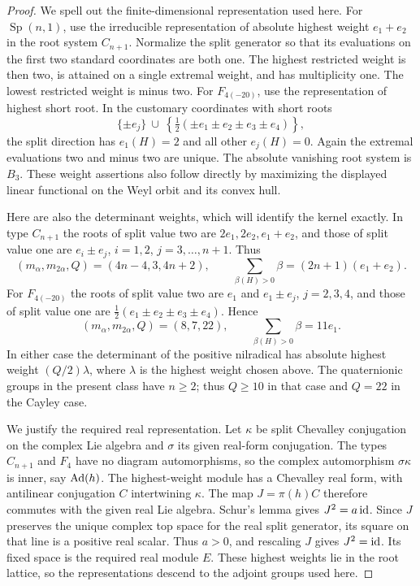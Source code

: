 \begin{proof}
We spell out the finite-dimensional representation used here.  For
$\operatorname{Sp}(n,1)$, use the irreducible representation of absolute highest
weight $e_1+e_2$ in the root system $C_{n+1}$.  Normalize the split
generator so that its evaluations on the first two standard
coordinates are both one.  The highest restricted weight is then two,
is attained on a single extremal weight, and has multiplicity one.
The lowest restricted weight is minus two.  For $F_{4(-20)}$, use the
representation of highest short root.  In the customary coordinates
with short roots
\[
 \{\pm e_j\}\ \cup\
 \left\{\tfrac12(\pm e_1\pm e_2\pm e_3\pm e_4)\right\},
\]
the split direction has $e_1(H)=2$ and all other $e_j(H)=0$.
Again the extremal evaluations two and minus two are unique.  The
absolute vanishing root system is $B_3$.  These weight assertions also
follow directly by maximizing the displayed linear functional on the
Weyl orbit and its convex hull.

Here are also the determinant weights, which will identify the kernel
exactly. In type $C_{n+1}$ the roots of split value two are
$2e_1,2e_2,e_1+e_2$, and those of split value one are
$e_i\pm e_j$, $i=1,2$, $j=3,\ldots,n+1$. Thus
\[
 (m_\alpha,m_{2\alpha},Q)=(4n-4,3,4n+2),\qquad
 \sum_{\beta(H)>0}\beta=(2n+1)(e_1+e_2).
\]
For $F_{4(-20)}$ the roots of split value two are $e_1$ and
$e_1\pm e_j$, $j=2,3,4$, and those of split value one are
$\tfrac12(e_1\pm e_2\pm e_3\pm e_4)$. Hence
\[
 (m_\alpha,m_{2\alpha},Q)=(8,7,22),\qquad
 \sum_{\beta(H)>0}\beta=11e_1.
\]
In either case the determinant of the positive nilradical has absolute
highest weight $(Q/2)\lambda$, where $\lambda$ is the highest weight
chosen above. The quaternionic groups in the present class have $n\ge2$;
thus $Q\ge10$ in that case and $Q=22$ in the Cayley case.

We justify the required real representation. Let $\kappa$ be split
Chevalley conjugation on the complex Lie algebra and $\sigma$ its given
real-form conjugation. The types $C_{n+1}$ and $F_4$ have no diagram
automorphisms, so the complex automorphism $\sigma\kappa$ is inner,
say $\operatorname{Ad}(h)$. The highest-weight module has a Chevalley real form, with
antilinear conjugation $C$ intertwining $\kappa$. The map $J=\pi(h)C$
therefore commutes with the given real Lie algebra. Schur's lemma gives
$J^2=a\operatorname{id}$. Since $J$ preserves the unique complex top space for the
real split generator, its square on that line is a positive real scalar.
Thus $a>0$, and rescaling $J$ gives $J^2=\operatorname{id}$. Its fixed space is the
required real module $E$. These highest weights lie in the root lattice,
so the representations descend to the adjoint groups used here.


\end{proof}

